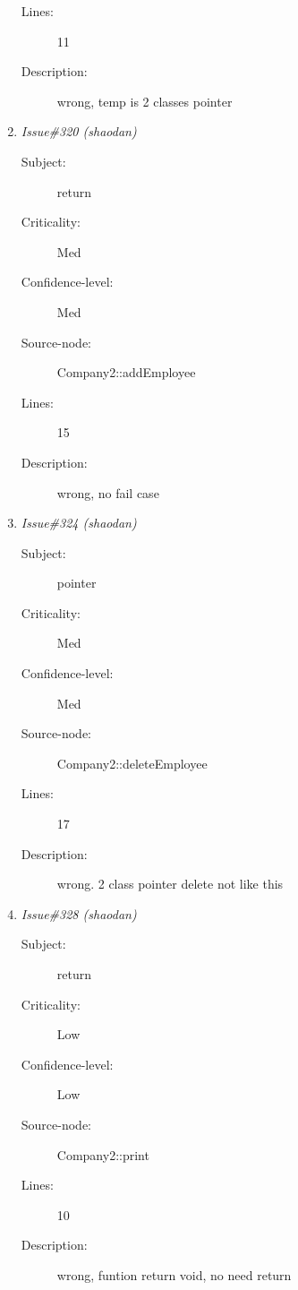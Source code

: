 \begin{enumerate}
\begin{description}
\item [Lines:] 11

\item [Description:] wrong, temp is 2 classes pointer
\end{description}
\item {\it Issue\#320 (shaodan)}
\begin{description}
\item [Subject:] return
\item [Criticality:] Med
\item [Confidence-level:] Med
\item [Source-node:] Company2::addEmployee

\item [Lines:] 15

\item [Description:] wrong, no fail case
\end{description}
\item {\it Issue\#324 (shaodan)}
\begin{description}
\item [Subject:] pointer
\item [Criticality:] Med
\item [Confidence-level:] Med
\item [Source-node:] Company2::deleteEmployee

\item [Lines:] 17

\item [Description:] wrong. 2 class pointer delete not like this
\end{description}
\item {\it Issue\#328 (shaodan)}
\begin{description}
\item [Subject:] return
\item [Criticality:] Low
\item [Confidence-level:] Low
\item [Source-node:] Company2::print

\item [Lines:] 10

\item [Description:] wrong, funtion return void, no need return
\end{description}
\end{enumerate}
